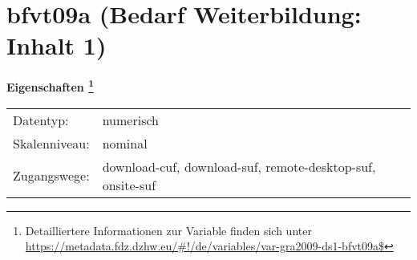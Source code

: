 
    \setcounter{footnote}{0}

    \vspace*{-1.8cm}
	\section{bfvt09a (Bedarf Weiterbildung: Inhalt 1)}
	\label{section:bfvt09a}



    \vspace*{0.5cm}
    \noindent\textbf{Eigenschaften
	\footnote{Detailliertere Informationen zur Variable finden sich unter
		\url{https://metadata.fdz.dzhw.eu/\#!/de/variables/var-gra2009-ds1-bfvt09a$}}}\\
	\begin{tabularx}{\hsize}{@{}lX}
	Datentyp: & numerisch \\
	Skalenniveau: & nominal \\
	Zugangswege: &
	  download-cuf, 
	  download-suf, 
	  remote-desktop-suf, 
	  onsite-suf
 \\
    \end{tabularx}



